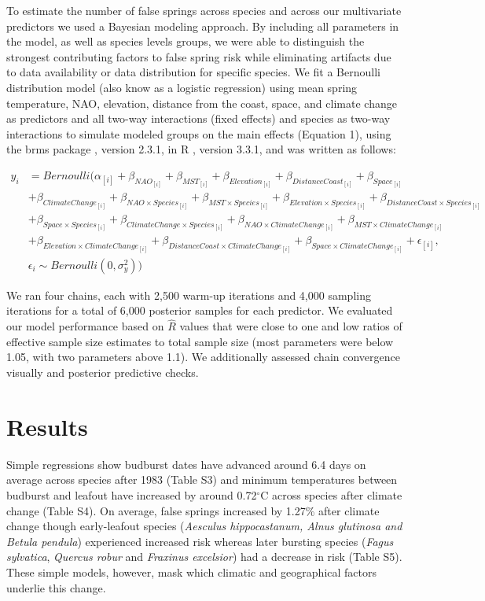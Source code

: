 \documentclass{article}\usepackage[]{graphicx}\usepackage[]{color}
\begin{document}
To estimate the number of false springs across species and across our multivariate predictors we used a Bayesian modeling approach. By including all parameters in the model, as well as species levels groups, we were able to distinguish the strongest contributing factors to false spring risk while eliminating artifacts due to data availability or data distribution for specific species. We fit a Bernoulli distribution model (also know as a logistic regression) using mean spring temperature, NAO, elevation, distance from the coast, space, and climate change as predictors and all two-way interactions (fixed effects) and species as two-way interactions to simulate modeled groups on the main effects (Equation 1), using the brms package \citep{brms}, version 2.3.1,  in R \citep{R}, version 3.3.1, and was written as follows:

\begin{align*}
y_i &= Bernoulli(\alpha_{[i]} +  \beta_{NAO_{[i]}} + \beta_{MST_{[i]}} + \beta_{Elevation_{[i]}} + \beta_{DistanceCoast_{[i]}} + \beta_{Space_{[i]}} \\ 
  &+ \beta_{ClimateChange_{[i]}} + \beta_{NAO \times Species_{[i]}} + \beta_{MST \times Species_{[i]}} + \beta_{Elevation \times Species_{[i]}} + \beta_{DistanceCoast \times Species_{[i]}}\\
  &+ \beta_{Space \times Species_{[i]}} + \beta_{ClimateChange \times Species_{[i]}} + \beta_{NAO \times ClimateChange_{[i]}} + \beta_{MST \times ClimateChange_{[i]}}\\
  &+ \beta_{Elevation \times ClimateChange_{[i]}} + \beta_{DistanceCoast \times ClimateChange_{[i]}} + \beta_{Space \times ClimateChange_{[i]}} + \epsilon_{[i]},\nonumber\\
  & \epsilon_i \sim Bernoulli(0,\sigma^2_y))\tag{1}
\end{align*}

We ran four chains, each with 2,500 warm-up iterations and 4,000 sampling iterations for a total of 6,000 posterior samples for each predictor. We evaluated our model performance based on $\hat{R}$ values that were close to one and low ratios of effective sample size estimates to total sample size (most parameters were below 1.05, with two parameters above 1.1). We additionally assessed chain convergence visually and posterior predictive checks.

\section*{Results}
Simple regressions show budburst dates have advanced around 6.4 days on average across species after 1983 (Table S3) and minimum temperatures between budburst and leafout have increased by around 0.72$^{\circ}$C across species after climate change (Table S4). On average, false springs increased by 1.27\% after climate change though early-leafout species (\textit{Aesculus hippocastanum, \textit{Alnus glutinosa} and \textit{Betula pendula}}) experienced increased risk whereas later bursting species (\textit{Fagus sylvatica}, \textit{Quercus robur} and \textit{Fraxinus excelsior}) had a decrease in risk (Table S5). These simple models, however, mask which climatic and geographical factors underlie this change.
\end{document}
